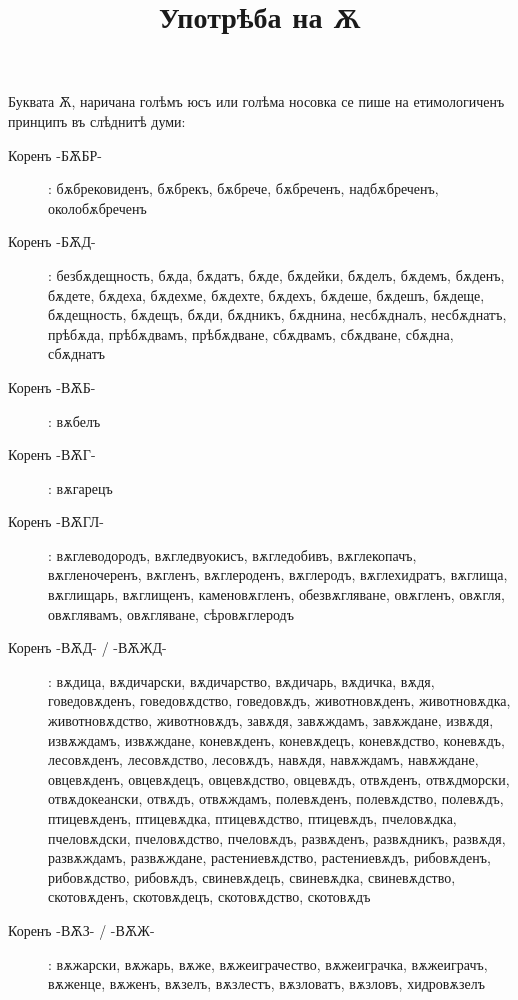 \documentclass{article}
\begin{document}
	\title{Употрѣба на Ѫ}
	\maketitle
	    
	Буквата Ѫ, наричана голѣмъ юсъ или голѣма носовка се пише на етимологиченъ принципъ въ слѣднитѣ думи:
 
 	\begin{description}
 		\item [Коренъ -БѪБР-]: бѫбрековиденъ, бѫбрекъ, бѫбрече, бѫбреченъ, надбѫбреченъ, околобѫбреченъ
 		\item[Коренъ -БѪД-]: безбѫдещность, бѫда, бѫдатъ, бѫде, бѫдейки, бѫделъ, бѫдемъ, бѫденъ, бѫдете, бѫдеха, бѫдехме, бѫдехте, бѫдехъ, бѫдеше, бѫдешъ, бѫдеще, бѫдещность, бѫдещъ, бѫди, бѫдникъ, бѫднина, несбѫдналъ, несбѫднатъ, прѣбѫда, прѣбѫдвамъ, прѣбѫдване, сбѫдвамъ, сбѫдване, сбѫдна, сбѫднатъ
 		
 		\item[Коренъ -ВѪБ-]: вѫбелъ
 		
 		\item[Коренъ -ВѪГ-]: вѫгарецъ
 		
 		\item[Коренъ -ВѪГЛ-]: вѫглеводородъ, вѫгледвуокисъ, вѫгледобивъ, вѫглекопачъ, вѫгленочеренъ, вѫгленъ, вѫглероденъ, вѫглеродъ, вѫглехидратъ, вѫглища, вѫглищарь, вѫглищенъ, каменовѫгленъ, обезвѫгляване, овѫгленъ, овѫгля, овѫглявамъ, овѫгляване, сѣровѫглеродъ
 		
 		\item[Коренъ -ВѪД- / -ВѪЖД-] : вѫдица, вѫдичарски, вѫдичарство, вѫдичарь, вѫдичка, вѫдя, говедовѫденъ, говедовѫдство, говедовѫдъ, животновѫденъ, животновѫдка, животновѫдство, животновѫдъ, завѫдя, завѫждамъ, завѫждане, извѫдя, извѫждамъ, извѫждане, коневѫденъ, коневѫдецъ, коневѫдство, коневѫдъ, лесовѫденъ, лесовѫдство, лесовѫдъ, навѫдя, навѫждамъ, навѫждане, овцевѫденъ, овцевѫдецъ, овцевѫдство, овцевѫдъ, отвѫденъ, отвѫдморски, отвѫдокеански, отвѫдъ, отвѫждамъ, полевѫденъ, полевѫдство, полевѫдъ, птицевѫденъ, птицевѫдка, птицевѫдство, птицевѫдъ, пчеловѫдка, пчеловѫдски, пчеловѫдство, пчеловѫдъ, развѫденъ, развѫдникъ, развѫдя, развѫждамъ, развѫждане, растениевѫдство, растениевѫдъ, рибовѫденъ, рибовѫдство, рибовѫдъ, свиневѫдецъ, свиневѫдка, свиневѫдство, %
 		скотовѫденъ, скотовѫдецъ, скотовѫдство, скотовѫдъ

    	\item[Коренъ -ВѪЗ- / -ВѪЖ-]: вѫжарски, вѫжарь, вѫже, вѫжеиграчество, вѫжеиграчка, вѫжеиграчъ, вѫженце, вѫженъ, вѫзелъ, вѫзлестъ, вѫзловатъ, вѫзловъ, хидровѫзелъ


\end{description}
\end{document}

